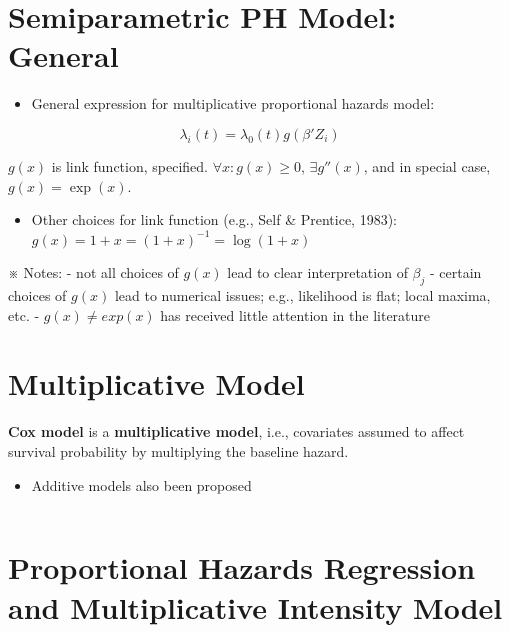 \documentclass[
]{book}
\providecommand{\tightlist}{%
  \setlength{\itemsep}{0pt}\setlength{\parskip}{0pt}}
\theoremstyle{definition}
\theoremstyle{definition}
\theoremstyle{definition}
\theoremstyle{definition}
\theoremstyle{remark}
\begin{document}
\hypertarget{semiparametric-ph-model-general}{%
\section{Semiparametric PH Model: General}\label{semiparametric-ph-model-general}}

\begin{itemize}
\tightlist
\item
  General expression for multiplicative proportional hazards model:
\end{itemize}

\[
\lambda_i (t) = \lambda_0 (t) g(\beta ' Z_i )
\]

\(g(x)\) is link function, specified. \(\forall x: g(x) \ge 0\), \(\exists g''(x)\), and in special case, \(g(x) = \exp(x)\).

\begin{itemize}
\tightlist
\item
  Other choices for link function (e.g., Self \& Prentice, 1983):
  \(g(x) = 1+x = (1+x)^{-1} = \log(1+x)\)
\end{itemize}

※ Notes:
- not all choices of \(g(x)\) lead to clear interpretation of \(\beta_j\)
- certain choices of \(g(x)\) lead to numerical issues; e.g., likelihood is flat; local maxima, etc.
- \(g(x) \not = exp(x)\) has received little attention in the literature

\hypertarget{multiplicative-model}{%
\section{Multiplicative Model}\label{multiplicative-model}}

\textbf{Cox model} is a \textbf{multiplicative model}, i.e., covariates assumed to affect survival probability by multiplying the baseline hazard.

\begin{itemize}
\tightlist
\item
  Additive models also been proposed
\end{itemize}

\[
\]

\hypertarget{proportional-hazards-regression-and-multiplicative-intensity-model}{%
\section{Proportional Hazards Regression and Multiplicative Intensity Model}\label{proportional-hazards-regression-and-multiplicative-intensity-model}}
\end{document}
